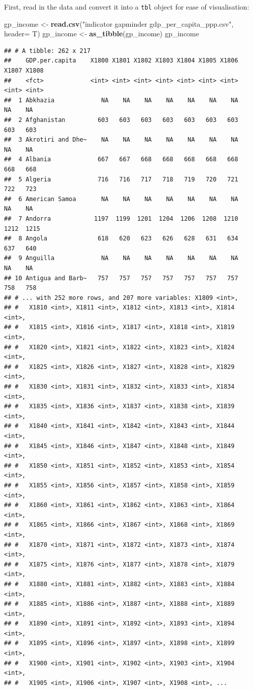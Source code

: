 \documentclass[]{book}
\newenvironment{Shaded}{\begin{snugshade}}{\end{snugshade}}
\newcommand{\KeywordTok}[1]{\textcolor[rgb]{0.13,0.29,0.53}{\textbf{{#1}}}}
\newcommand{\DataTypeTok}[1]{\textcolor[rgb]{0.13,0.29,0.53}{{#1}}}
\newcommand{\StringTok}[1]{\textcolor[rgb]{0.31,0.60,0.02}{{#1}}}
\newcommand{\NormalTok}[1]{{#1}}
\theoremstyle{definition}
\theoremstyle{definition}
\theoremstyle{definition}
\theoremstyle{remark}
\begin{document}
First, read in the data and convert it into a \texttt{tbl} object for
ease of visualisation:

\begin{Shaded}
\begin{Highlighting}[]
\NormalTok{gp_income <-}\StringTok{ }\KeywordTok{read.csv}\NormalTok{(}\StringTok{"indicator gapminder gdp_per_capita_ppp.csv"}\NormalTok{, }\DataTypeTok{header=} \NormalTok{T)}
\NormalTok{gp_income <-}\StringTok{ }\KeywordTok{as_tibble}\NormalTok{(gp_income)}
\NormalTok{gp_income}
\end{Highlighting}
\end{Shaded}

\begin{verbatim}
## # A tibble: 262 x 217
##    GDP.per.capita    X1800 X1801 X1802 X1803 X1804 X1805 X1806 X1807 X1808
##    <fct>             <int> <int> <int> <int> <int> <int> <int> <int> <int>
##  1 Abkhazia             NA    NA    NA    NA    NA    NA    NA    NA    NA
##  2 Afghanistan         603   603   603   603   603   603   603   603   603
##  3 Akrotiri and Dhe~    NA    NA    NA    NA    NA    NA    NA    NA    NA
##  4 Albania             667   667   668   668   668   668   668   668   668
##  5 Algeria             716   716   717   718   719   720   721   722   723
##  6 American Samoa       NA    NA    NA    NA    NA    NA    NA    NA    NA
##  7 Andorra            1197  1199  1201  1204  1206  1208  1210  1212  1215
##  8 Angola              618   620   623   626   628   631   634   637   640
##  9 Anguilla             NA    NA    NA    NA    NA    NA    NA    NA    NA
## 10 Antigua and Barb~   757   757   757   757   757   757   757   758   758
## # ... with 252 more rows, and 207 more variables: X1809 <int>,
## #   X1810 <int>, X1811 <int>, X1812 <int>, X1813 <int>, X1814 <int>,
## #   X1815 <int>, X1816 <int>, X1817 <int>, X1818 <int>, X1819 <int>,
## #   X1820 <int>, X1821 <int>, X1822 <int>, X1823 <int>, X1824 <int>,
## #   X1825 <int>, X1826 <int>, X1827 <int>, X1828 <int>, X1829 <int>,
## #   X1830 <int>, X1831 <int>, X1832 <int>, X1833 <int>, X1834 <int>,
## #   X1835 <int>, X1836 <int>, X1837 <int>, X1838 <int>, X1839 <int>,
## #   X1840 <int>, X1841 <int>, X1842 <int>, X1843 <int>, X1844 <int>,
## #   X1845 <int>, X1846 <int>, X1847 <int>, X1848 <int>, X1849 <int>,
## #   X1850 <int>, X1851 <int>, X1852 <int>, X1853 <int>, X1854 <int>,
## #   X1855 <int>, X1856 <int>, X1857 <int>, X1858 <int>, X1859 <int>,
## #   X1860 <int>, X1861 <int>, X1862 <int>, X1863 <int>, X1864 <int>,
## #   X1865 <int>, X1866 <int>, X1867 <int>, X1868 <int>, X1869 <int>,
## #   X1870 <int>, X1871 <int>, X1872 <int>, X1873 <int>, X1874 <int>,
## #   X1875 <int>, X1876 <int>, X1877 <int>, X1878 <int>, X1879 <int>,
## #   X1880 <int>, X1881 <int>, X1882 <int>, X1883 <int>, X1884 <int>,
## #   X1885 <int>, X1886 <int>, X1887 <int>, X1888 <int>, X1889 <int>,
## #   X1890 <int>, X1891 <int>, X1892 <int>, X1893 <int>, X1894 <int>,
## #   X1895 <int>, X1896 <int>, X1897 <int>, X1898 <int>, X1899 <int>,
## #   X1900 <int>, X1901 <int>, X1902 <int>, X1903 <int>, X1904 <int>,
## #   X1905 <int>, X1906 <int>, X1907 <int>, X1908 <int>, ...
\end{verbatim}
\end{document}
